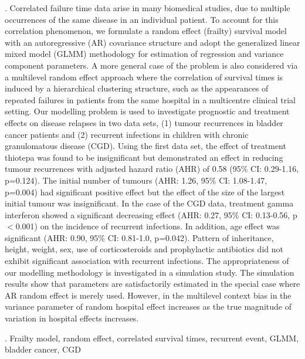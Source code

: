 \documentclass[12pt]{article}
\begin{document}
. Correlated failure time data arise in many biomedical studies, due to multiple occurrences of the same disease in an individual patient. To account for this correlation phenomenon, we formulate a random effect (frailty) survival model with an autoregressive (AR) covariance structure and adopt the generalized linear mixed model (GLMM) methodology for estimation of regression and variance component parameters. A more general case of the problem is also considered via a multilevel random effect approach where the correlation of survival times is induced by a hierarchical clustering structure, such as the appearances of repeated failures in patients from the same hospital in a multicentre clinical trial setting. Our modelling problem is used to investigate prognostic and treatment effects on disease relapses in two data sets, (1) tumour recurrences in bladder cancer patients and (2) recurrent infections in children with chronic granulomatous disease (CGD). Using the first data set, the effect of treatment thiotepa was found to be insignificant but demonstrated an effect in reducing tumour recurrences with adjusted hazard ratio (AHR) of 0.58 (95\% CI: 0.29-1.16, p=0.124). The initial number of tumours (AHR: 1.26, 95\% CI: 1.08-1.47, p=0.004) had significant positive effect but the effect of the size of the largest initial tumour was insignificant. In the case of the CGD data, treatment gamma interferon showed a significant decreasing effect (AHR: 0.27, 95\% CI: 0.13-0.56, p$<$0.001) on the incidence of recurrent infections. In addition, age effect was significant (AHR: 0.90,  95\% CI: 0.81-1.0, p=0.042). Pattern of inheritance, height, weight, sex, use of corticosteroids and prophylactic antibiotics did not exhibit significant association with recurrent infections. The appropriateness of our modelling methodology is investigated in a simulation study. The simulation results show that parameters are satisfactorily estimated in the special case where AR random effect is merely used. However, in the multilevel context bias in the variance parameter of random hospital effect increases as the true magnitude of variation in hospital effects increases. 
\vskip 2mm

.
Frailty model, random effect, correlated survival times, recurrent event, GLMM, bladder cancer, CGD   
\end{document}
